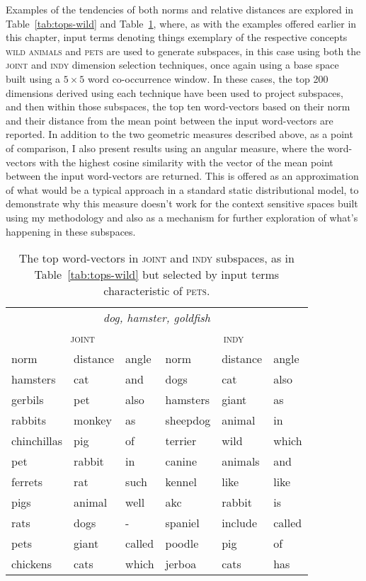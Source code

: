 Examples of the tendencies of both norms and relative distances are explored in Table~\ref{tab:tops-wild} and Table~\ref{tab:tops-pet}, where, as with the examples offered earlier in this chapter, input terms denoting things exemplary of the respective concepts \textsc{wild animals} and \textsc{pets} are used to generate subspaces, in this case using both the \textsc{joint} and \textsc{indy} dimension selection techniques, once again using a base space built using a $5 \times 5$ word co-occurrence window.  In these cases, the top 200 dimensions derived using each technique have been used to project subspaces, and then within those subspaces, the top ten word-vectors based on their norm and their distance from the mean point between the input word-vectors are reported.  In addition to the two geometric measures described above, as a point of comparison, I also present results using an angular measure, where the word-vectors with the highest cosine similarity with the vector of the mean point between the input word-vectors are returned.  This is offered as an approximation of what would be a typical approach in a standard static distributional model, to demonstrate why this measure doesn't work for the context sensitive spaces built using my methodology and also as a mechanism for further exploration of what's happening in these subspaces.

\begin{table}
\centering
\begin{tabular}{lll|lll}
\hline
\multicolumn{6}{c}{\emph{dog, hamster, goldfish}} \\
\multicolumn{3}{c}{\textsc{joint}} & \multicolumn{3}{c}{\textsc{indy}} \\
\hline
norm & distance & angle & norm & distance & angle \\
\hline
hamsters & cat & and & dogs & cat & also \\
gerbils & pet & also & hamsters & giant & as \\
rabbits & monkey & as & sheepdog & animal & in \\
chinchillas & pig & of & terrier & wild & which \\
pet & rabbit & in & canine & animals & and \\
ferrets & rat & such & kennel & like & like \\
pigs & animal & well & akc & rabbit & is \\
rats & dogs & - & spaniel & include & called \\
pets & giant & called & poodle & pig & of \\
chickens & cats & which & jerboa & cats & has \\
\hline
\end{tabular}
\caption[Top Pet Word-Vectors]{The top word-vectors in \textsc{joint} and \textsc{indy} subspaces, as in Table~\ref{tab:tops-wild} but selected by input terms characteristic of \textsc{pets}.}
\label{tab:tops-pet}
\end{table}

